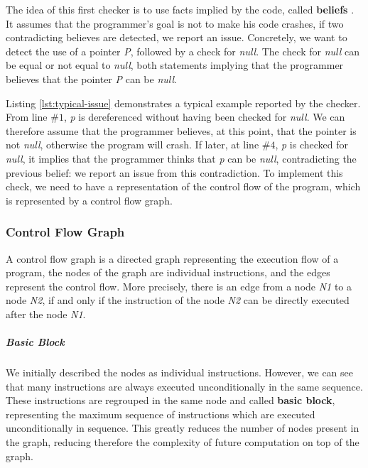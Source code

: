 The idea of this first checker is to use facts implied by the code, called \textbf{beliefs} \cite{Engler:2001:BDB:502059.502041}.
It assumes that the programmer’s goal is not to make his code crashes, if two contradicting believes are detected, we report an issue.
Concretely, we want to detect the use of a pointer \emph{P}, followed by a check for \emph{null}. 
The check for \emph{null} can be equal or not equal to \emph{null}, both statements implying that the programmer believes that the pointer \emph{P} can be \emph{null}.



Listing \ref{lst:typical-issue} demonstrates a typical example reported by the checker. 
From line $\#1$, \emph{p} is dereferenced without having been checked for \emph{null}.
We can therefore assume that the programmer believes, at this point, that the pointer is not \emph{null}, otherwise the program will crash. 
If later, at line $\#4$, \emph{p} is checked for \emph{null}, it implies that the programmer thinks that \emph{p} can be \emph{null}, contradicting the previous belief: we report an issue from this contradiction.
To implement this check, we need to have a representation of the control flow of the program, which is represented by a control flow graph.

\subsubsection{Control Flow Graph}
\label{subsubsec:control_flow_graph}

A control flow graph is a directed graph representing the execution flow of a program, the nodes of the graph are individual instructions, and the edges represent the control flow. More precisely, there is an edge from a node \emph{N1} to a node \emph{N2}, if and only if the instruction of the node \emph{N2} can be directly executed after the node \emph{N1}.


\subparagraph{Basic Block}
We initially described the nodes as individual instructions.
However, we can see that many instructions are always executed unconditionally in the same sequence.
These instructions are regrouped in the same node and called \textbf{basic block}, representing the maximum sequence of instructions which are executed unconditionally in sequence.
This greatly reduces the number of nodes present in the graph, reducing therefore the complexity of future computation on top of the graph.

